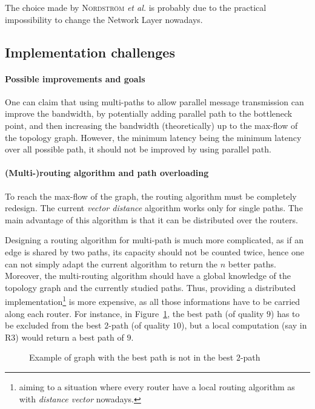 \documentclass[twocolumn]{article}
\begin{document}
The choice made by \textsc{Nordstr\"om} \emph{et al.} is probably due to the practical impossibility to change the Network Layer nowadays.

\subsection{Implementation challenges}
\paragraph{Possible improvements and goals}
One can claim that using multi-paths to allow parallel message transmission can improve the bandwidth, by potentially adding parallel path to the bottleneck point, and then increasing the bandwidth (theoretically) up to the max-flow of the topology graph. However, the minimum latency being the minimum latency over all possible path, it should not be improved by using parallel path.
\paragraph{(Multi-)routing algorithm and path overloading}
To reach the max-flow of the graph, the routing algorithm must be completely redesign. The current \emph{vector distance} algorithm works only for single paths. The main advantage of this algorithm is that it can be distributed over the routers.

Designing a routing algorithm for multi-path is much more complicated, as if an edge is shared by two paths, its capacity should not be counted twice, hence one can not simply adapt the current algorithm to return the $n$ better paths. Moreover, the multi-routing algorithm should have a global knowledge of the topology graph and the currently studied paths. Thus, providing a distributed implementation\footnote{aiming to a situation where every router have a local routing algorithm as with \emph{distance vector} nowadays.} is more expensive, as all those informations have to be carried along each router. For instance, in Figure~\ref{fig:graph}, the best path (of quality $9$) has to be excluded from the best $2$-path (of quality $10$), but a local computation (say in R$3$) would return a best path of $9$. 

\begin{figure}[h]
\caption{Example of graph with the best path is not in the best $2$-path}
\label{fig:graph}
\end{figure}
\end{document}
